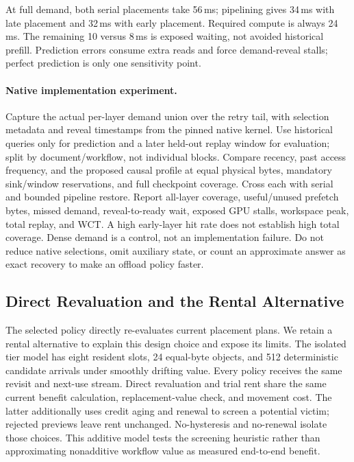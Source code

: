 \documentclass[sigplan,10pt,anonymous,nonacm]{acmart}
\begin{document}
At full demand, both serial placements take 56\,ms; pipelining gives
34\,ms with late placement and 32\,ms with early placement. Required
compute is always 24\,ms. The remaining 10 versus 8\,ms is exposed
waiting, not avoided historical prefill. Prediction errors consume
extra reads and force demand-reveal stalls; perfect prediction is only
one sensitivity point.

\paragraph{Native implementation experiment.}
Capture the actual per-layer demand union over the retry tail, with
selection metadata and reveal timestamps from the pinned native kernel.
Use historical queries only for prediction and a later held-out replay
window for evaluation; split by document/workflow, not individual blocks.
Compare recency, past access frequency, and the proposed causal profile
at equal physical bytes, mandatory sink/window reservations, and full
checkpoint coverage. Cross each with serial and bounded pipeline restore.
Report all-layer coverage, useful/unused prefetch bytes, missed demand,
reveal-to-ready wait, exposed GPU stalls, workspace peak, total replay,
and WCT. A high early-layer hit rate does not establish high total
coverage. Dense demand is a control, not an implementation failure.
Do not reduce native selections, omit auxiliary state, or count an
approximate answer as exact recovery to make an offload policy faster.

\FloatBarrier
\subsection{Direct Revaluation and the Rental Alternative}
\label{sec:eval-rental}

The selected policy directly re-evaluates current placement plans.
We retain a rental alternative to explain this design choice and expose
its limits. The isolated tier model has eight resident slots, 24 equal-byte objects,
and 512 deterministic candidate arrivals under smoothly drifting value.
Every policy receives the same revisit and next-use stream. Direct
revaluation and trial rent share the same current benefit calculation,
replacement-value check, and movement cost. The latter additionally uses
credit aging and renewal to screen a potential victim; rejected previews
leave rent unchanged. No-hysteresis and no-renewal isolate those choices.
This additive model tests the screening heuristic rather than approximating
nonadditive workflow value as measured end-to-end benefit.
\end{document}

